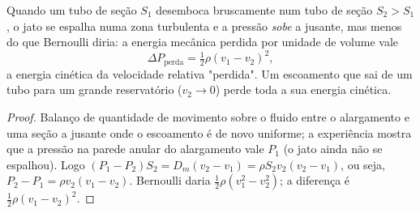 \begin{proposition}\label{prop:b2:flow-balances:borda}
Quando um tubo de seção $S_1$ desemboca bruscamente num tubo de seção $S_2
> S_1$, o jato se espalha numa zona turbulenta e a pressão
\emph{sobe} a jusante, mas menos do que Bernoulli diria: a
energia mecânica perdida por unidade de volume vale
\[
\Delta P_{\text{perda}} = \tfrac12\rho(v_1 - v_2)^2 ,
\]
a energia cinética da velocidade relativa "perdida". Um escoamento que sai de um
tubo para um grande reservatório ($v_2 \to 0$) perde toda a sua energia cinética.
\end{proposition}

\begin{proof}
Balanço de quantidade de movimento sobre o fluido entre o alargamento e uma seção
a jusante onde o escoamento é de novo uniforme; a experiência mostra que a
pressão na parede anular do alargamento vale $P_1$ (o jato ainda
não se espalhou). Logo $(P_1 - P_2)S_2 = D_m(v_2 - v_1) = \rho S_2v_2(v_2 -
v_1)$, ou seja, $P_2 - P_1 = \rho v_2(v_1 - v_2)$. Bernoulli daria
$\tfrac12\rho(v_1^2 - v_2^2)$; a diferença é $\tfrac12\rho(v_1 - v_2)^2$.
\end{proof}

